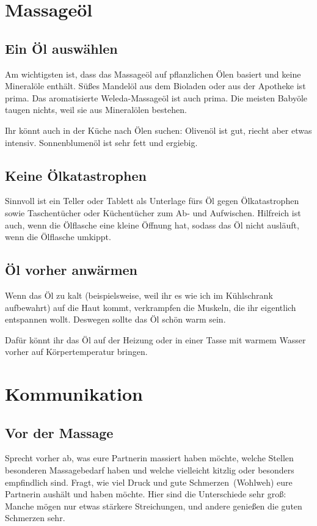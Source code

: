 \section{Massageöl}

\subsection{Ein Öl auswählen}

Am wichtigsten ist, dass das Massageöl auf pflanzlichen Ölen basiert und keine Mineralöle enthält. Süßes Mandelöl aus dem Bioladen oder aus der Apotheke ist prima. Das aromatisierte Weleda-Massageöl ist auch prima. Die meisten Babyöle taugen nichts, weil sie aus Mineralölen bestehen.

Ihr könnt auch in der Küche nach Ölen suchen: Olivenöl ist gut, riecht aber etwas intensiv. Sonnenblumenöl ist sehr fett und ergiebig.

\subsection{Keine Ölkatastrophen}

Sinnvoll ist ein Teller oder Tablett als Unterlage fürs Öl gegen Ölkatastrophen sowie Taschentücher oder Küchentücher zum Ab- und Aufwischen. Hilfreich ist auch, wenn die Ölflasche eine kleine Öffnung hat, sodass das Öl nicht ausläuft, wenn die Ölflasche umkippt.

\subsection{Öl vorher anwärmen}

Wenn das Öl zu kalt (beispielsweise, weil ihr es wie ich im Kühlschrank aufbewahrt) auf die Haut kommt, verkrampfen die Muskeln, die ihr eigentlich entspannen wollt. Deswegen sollte das Öl schön warm sein.

Dafür könnt ihr das Öl auf der Heizung oder in einer Tasse mit warmem Wasser vorher auf Körpertemperatur bringen.


\section{Kommunikation}

\subsection{Vor der Massage}

Sprecht vorher ab, was eure Partnerin massiert haben möchte, welche Stellen besonderen Massagebedarf haben und welche vielleicht kitzlig oder besonders empfindlich sind. Fragt, wie viel Druck und \glqq gute Schmerzen\grqq\  (\glqq Wohlweh\grqq) eure Partnerin aushält und haben möchte. Hier sind die Unterschiede sehr groß: Manche mögen nur etwas stärkere Streichungen, und andere genießen die guten Schmerzen sehr.

